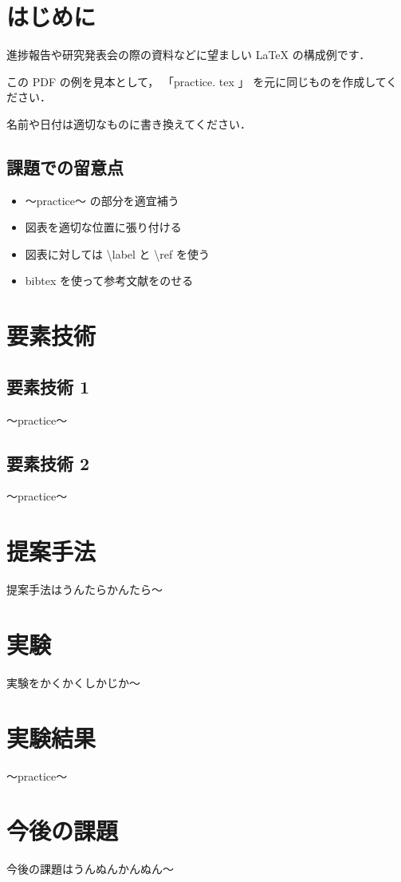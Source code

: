 \documentclass[twocolumn]{ujarticle}     %
\begin{document}

\section{はじめに}
進捗報告や研究発表会の際の資料などに望ましい LaTeX の構成例です．

この PDF の例を見本として， 「practice. tex 」 を元に同じものを作成してください．

名前や日付は適切なものに書き換えてください．

\subsection{課題での留意点}
\begin{itemize}

\item 〜practice〜 の部分を適宜補う
\item 図表を適切な位置に張り付ける
\item 図表に対しては \textbackslash label と \textbackslash ref を使う
\item bibtex を使って参考文献をのせる
\end{itemize}

\section{要素技術}

\subsection{要素技術 1 }
〜practice〜 

\subsection{要素技術 2 }
〜practice〜 

\section{提案手法}
提案手法はうんたらかんたら〜 \cite{translate}

\section{実験}
実験をかくかくしかじか〜

\section{実験結果}
〜practice〜 

\section{今後の課題}
今後の課題はうんぬんかんぬん〜


\end{document}

